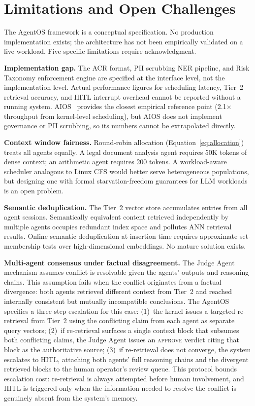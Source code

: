 \documentclass[journal]{IEEEtran}
\begin{document}
\section{Limitations and Open Challenges}
\label{sec:limitations}

The AgentOS framework is a conceptual specification. No production implementation exists; the architecture has not been empirically validated on a live workload. Five specific limitations require acknowledgment.

\textbf{Implementation gap.} The ACR format, PII scrubbing NER pipeline, and Risk Taxonomy enforcement engine are specified at the interface level, not the implementation level. Actual performance figures for scheduling latency, Tier~2 retrieval accuracy, and HITL interrupt overhead cannot be reported without a running system. AIOS~\cite{mei2024aios} provides the closest empirical reference point (2.1$\times$ throughput from kernel-level scheduling), but AIOS does not implement governance or PII scrubbing, so its numbers cannot be extrapolated directly.

\textbf{Context window fairness.} Round-robin allocation (Equation~\ref{eq:allocation}) treats all agents equally. A legal document analysis agent requires 50K tokens of dense context; an arithmetic agent requires 200 tokens. A workload-aware scheduler analogous to Linux CFS would better serve heterogeneous populations, but designing one with formal starvation-freedom guarantees for LLM workloads is an open problem.

\textbf{Semantic deduplication.} The Tier~2 vector store accumulates entries from all agent sessions. Semantically equivalent content retrieved independently by multiple agents occupies redundant index space and pollutes ANN retrieval results. Online semantic deduplication at insertion time requires approximate set-membership tests over high-dimensional embeddings. No mature solution exists.

\textbf{Multi-agent consensus under factual disagreement.} The Judge Agent mechanism assumes conflict is resolvable given the agents' outputs and reasoning chains. This assumption fails when the conflict originates from a factual divergence: both agents retrieved different context from Tier~2 and reached internally consistent but mutually incompatible conclusions. The AgentOS specifies a three-step escalation for this case: (1)~the kernel issues a targeted re-retrieval from Tier~2 using the conflicting claim from each agent as separate query vectors; (2)~if re-retrieval surfaces a single context block that subsumes both conflicting claims, the Judge Agent issues an \textsc{approve} verdict citing that block as the authoritative source; (3)~if re-retrieval does not converge, the system escalates to HITL, attaching both agents' full reasoning chains and the divergent retrieved blocks to the human operator's review queue. This protocol bounds escalation cost: re-retrieval is always attempted before human involvement, and HITL is triggered only when the information needed to resolve the conflict is genuinely absent from the system's memory.
\end{document}
